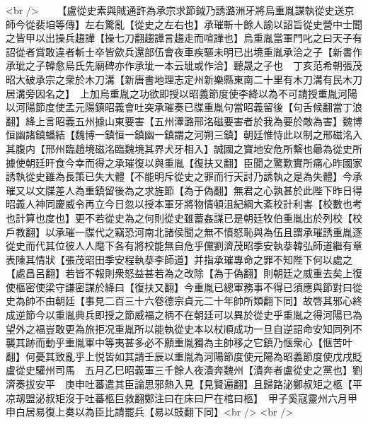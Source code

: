 <br />
　　【盧從史素與賊通許為承宗求節鉞乃誘潞洲牙將烏重胤謀執從史送京師今從裴垍等傳】左右驚亂【從史之左右也】承璀斬十餘人諭以詔旨從史營中士聞之皆甲以出操兵趨譁【操七刀翻趨譁言趨走而喧譁也】烏重胤當軍門叱之曰天子有詔從者賞敢違者斬士卒皆歛兵還部伍會夜車疾驅未明已出境重胤承洽之子【新書作承玼之子韓愈烏氏先廟碑亦作承玼一本云玼或作洽】聽晟之子也　丁亥范希朝張茂昭大破承宗之衆於木刀溝【新唐書地理志定州新樂縣東南二十里有木刀溝有民木刀居溝旁因名之】　上加烏重胤之功欲即授以昭義節度使李絳以為不可請授重胤河陽以河陽節度使孟元陽鎮昭義會吐突承璀奏已牒重胤句當昭義留後【句舌候翻當丁浪翻】絳上言昭義五州據山東要害【五州澤潞邢洺磁要害者於我為要於敵為害】魏博恒幽諸鎮蟠結【魏博一鎮恒一鎮幽一鎮謂之河朔三鎮】朝廷惟恃此以制之邢磁洺入其腹内【邢州臨趙境磁洺臨魏境其界犬牙相入】誠國之寶地安危所繫也曏為從史所據使朝廷旰食今幸而得之承璀復以與重胤【復扶又翻】臣聞之驚歎實所痛心昨國家誘執從史雖為長策已失大體【不能明斥從史之罪而行天討乃誘執之是為失體】今承璀又以文牒差人為重鎮留後為之求旌節【為于偽翻】無君之心孰甚於此陛下昨日得昭義人神同慶威令再立今日忽以授本軍牙將物情頓沮紀綱大紊校計利害【校數也考也計算也度也】更不若從史為之何則從史雖蓄姦謀已是朝廷牧伯重胤出於列校【校戶教翻】以承璀一牒代之竊恐河南北諸侯聞之無不憤怒恥與為伍且謂承璀誘重胤逐從史而代其位彼人人麾下各有將校能無自危乎儻劉濟茂昭季安執㳟韓弘師道繼有章表陳其情狀【張茂昭田季安程執㳟李師道】并指承璀專命之罪不知陛下何以處之【處昌呂翻】若皆不報則衆怒益甚若為之改除【為于偽翻】則朝廷之威重去矣上復使樞密使梁守謙密謀於絳曰【復扶又翻】今重胤已總軍務事不得已須應與節對曰從史為帥不由朝廷【事見二百三十六卷德宗貞元二十年帥所類翻下同】故啓其邪心終成逆節今以重胤典兵即授之節威福之柄不在朝廷可以異於從史乎重胤之得河陽已為望外之福豈敢更為旅拒况重胤所以能執從史本以杖順成功一旦自逆詔命安知同列不襲其跡而動乎重胤軍中等夷甚多必不願重胤獨為主帥移之它鎮乃惬衆心【惬苦叶翻】何憂其致亂乎上悦皆如其請壬辰以重胤為河陽節度使元陽為昭義節度使戊戌貶盧從史驩州司馬　五月乙巳昭義軍三千餘人夜潰奔魏州【潰奔者盧從史之黨也】劉濟奏拔安平　庚申吐蕃遣其臣論思邪熱入見【見賢遍翻】且歸路泌鄭叔矩之柩【平凉刼盟泌叔矩沒于吐蕃柩巨救翻鄭注曰在床曰尸在棺曰柩】　甲子奚寇靈州六月甲申白居易復上奏以為臣比請罷兵【易以豉翻下同】<br />
<br />
